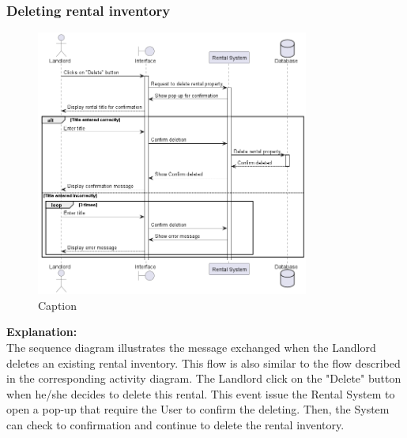 \subsubsection{Deleting rental inventory}
\begin{figure}[H]
    \centering
    \includegraphics[width=0.8\textwidth]{Images/Sequence/seq_diag_delete_rental_inventory.png}
    \caption{Caption}
    \label{fig:enter-label}
\end{figure}
\noindent \textbf{Explanation:}\\
The sequence diagram illustrates the message exchanged when the Landlord deletes an existing rental inventory. This flow is also similar to the flow described in the corresponding activity diagram. The Landlord click on the "Delete" button when he/she decides to delete this rental. This event issue the Rental System to open a pop-up that require the User to confirm the deleting. Then, the System can check to confirmation and continue to delete the rental inventory.